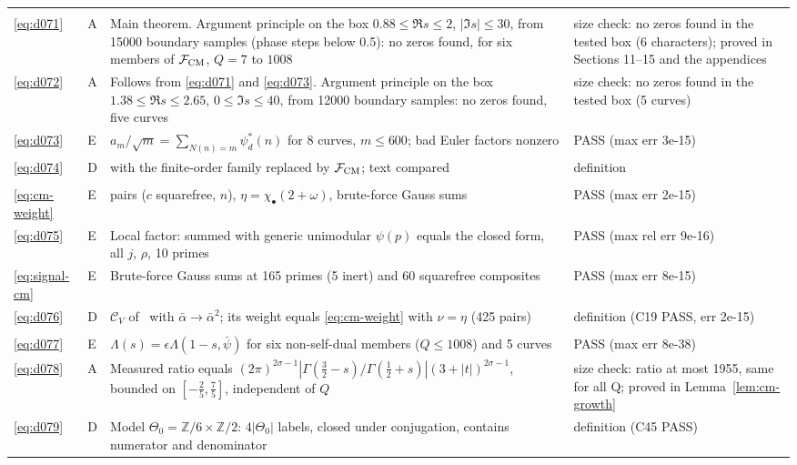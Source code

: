\documentclass[11pt]{article}
\numberwithin{equation}{section}
\begin{document}
\begin{longtable}{@{}>{\raggedright\arraybackslash}p{1.2cm}>{\centering\arraybackslash}p{0.7cm}>{\raggedright\arraybackslash}p{9.05cm}>{\raggedright\arraybackslash}p{4.3cm}@{}}
\multicolumn{4}{@{}l}{\emph{Section~11}}\\
\eqref{eq:d071} & A & Main theorem. Argument principle on the box $0.88\le\Re s\le2$, $|\Im s|\le30$, from 15000 boundary samples (phase steps below 0.5): no zeros found, for six members of $\mathcal F_{\rm CM}$, $Q=7$ to $1008$ & size check: no zeros found in the tested box (6 characters); proved in Sections 11--15 and the appendices\\
\eqref{eq:d072} & A & Follows from \eqref{eq:d071} and \eqref{eq:d073}. Argument principle on the box $1.38\le\Re s\le2.65$, $0\le\Im s\le40$, from 12000 boundary samples: no zeros found, five curves & size check: no zeros found in the tested box (5 curves)\\
\eqref{eq:d073} & E & $a_m/\sqrt m=\sum_{N(n)=m}\psi_d^*(n)$ for 8 curves, $m\le600$; bad Euler factors nonzero & PASS (max err 3e-15)\\
\eqref{eq:d074} & D & \cite[eq.~(2.1)]{OAI78} with the finite-order family replaced by $\mathcal F_{\rm CM}$; text compared & definition\\
\multicolumn{4}{@{}l}{\emph{Section~12}}\\
\eqref{eq:cm-weight} & E & 425 pairs ($c$ squarefree, $n$), $\eta=\chi_\bullet(2+\omega)$, brute-force Gauss sums & PASS (max err 2e-15)\\
\eqref{eq:d075} & E & Local factor: \cite[eq.~(7.10)]{OAI78} summed with generic unimodular $\psi(p)$ equals the closed form, all $j$, $\rho$, 10 primes & PASS (max rel err 9e-16)\\
\eqref{eq:signal-cm} & E & Brute-force Gauss sums at 165 primes (5 inert) and 60 squarefree composites & PASS (max err 8e-15)\\
\eqref{eq:d076} & D & $\mathcal C_V$ of~\cite{OAI78} with $\bar\alpha\to\bar\alpha^2$; its weight equals \eqref{eq:cm-weight} with $\nu=\eta$ (425 pairs) & definition (C19 PASS, err 2e-15)\\
\multicolumn{4}{@{}l}{\emph{Section~13}}\\
\eqref{eq:d077} & E & $\Lambda(s)=\epsilon\Lambda(1-s,\bar\psi)$ for six non-self-dual members ($Q\le1008$) and 5 curves & PASS (max err 8e-38)\\
\eqref{eq:d078} & A & Measured ratio equals $(2\pi)^{2\sigma-1}|\Gamma(\frac32-s)/\Gamma(\frac12+s)|(3+|t|)^{2\sigma-1}$, bounded on $[-\frac25,\frac75]$, independent of $Q$ & size check: ratio at most 1955, same for all Q; proved in Lemma~\ref{lem:cm-growth}\\
\eqref{eq:d079} & D & Model $\Theta_0=\mathbb Z/6\times\mathbb Z/2$: $4|\Theta_0|$ labels, closed under conjugation, contains numerator and denominator & definition (C45 PASS)\\

\end{longtable}
\end{document}
